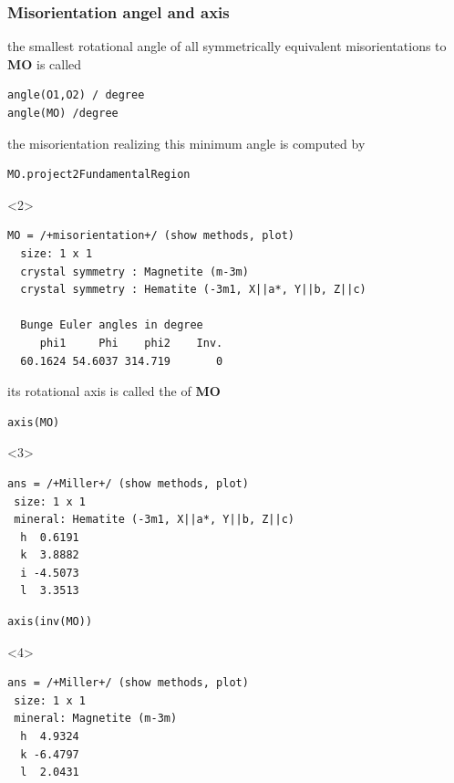 \documentclass[compress]{beamer}
\begin{document}
\begin{frame}[fragile]
  \frametitle{Misorientation angel and axis}

  \begin{overlayarea}{\textwidth}{8cm}

    the smallest rotational angle of all symmetrically equivalent
    misorientations to \textbf{MO} is called 
    \begin{lstlisting}[style=input]
angle(O1,O2) / degree
angle(MO) /degree
    \end{lstlisting}

  \pause
  \medskip

  the misorientation realizing this minimum angle is computed by
  \vspace{-0.2cm}
    \begin{lstlisting}[style=input]
MO.project2FundamentalRegion
    \end{lstlisting}
\begin{onlyenv}<2>
  \vspace{-.3cm}
  \begin{lstlisting}[style=output]
MO = /+misorientation+/ (show methods, plot)
  size: 1 x 1
  crystal symmetry : Magnetite (m-3m)
  crystal symmetry : Hematite (-3m1, X||a*, Y||b, Z||c)

  Bunge Euler angles in degree
     phi1     Phi    phi2    Inv.
  60.1624 54.6037 314.719       0
\end{lstlisting}
\end{onlyenv}

\pause
\medskip

  its rotational axis is called the  of
  \textbf{MO}
  \vspace{-0.2cm}
\begin{lstlisting}[style=input]
axis(MO)
\end{lstlisting}
\vspace{-.3cm}

  \begin{onlyenv}<3>
\begin{lstlisting}[style=output]
ans = /+Miller+/ (show methods, plot)
 size: 1 x 1
 mineral: Hematite (-3m1, X||a*, Y||b, Z||c)
  h  0.6191
  k  3.8882
  i -4.5073
  l  3.3513
\end{lstlisting}
\end{onlyenv}

  \pause
\begin{lstlisting}[style=input]
axis(inv(MO))
\end{lstlisting}
\vspace{-.3cm}
    \begin{onlyenv}<4>
\begin{lstlisting}[style=output]
ans = /+Miller+/ (show methods, plot)
 size: 1 x 1
 mineral: Magnetite (m-3m)
  h  4.9324
  k -6.4797
  l  2.0431
\end{lstlisting}
\end{onlyenv}


\end{overlayarea}
\end{frame}
\end{document}
